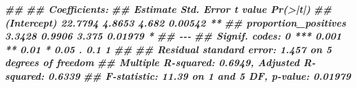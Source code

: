 \documentclass[
  11pt,
  oneside]{book}
\newenvironment{Shaded}{\begin{snugshade}}{\end{snugshade}}
\newcommand{\DocumentationTok}[1]{\textcolor[rgb]{0.56,0.35,0.01}{\textbf{\textit{#1}}}}
\begin{document}
\begin{Shaded}
\begin{Highlighting}[]
\DocumentationTok{\#\# }
\DocumentationTok{\#\# Coefficients:}
\DocumentationTok{\#\#                      Estimate Std. Error t value Pr(\textgreater{}|t|)   }
\DocumentationTok{\#\# (Intercept)           22.7794     4.8653   4.682  0.00542 **}
\DocumentationTok{\#\# proportion\_positives   3.3428     0.9906   3.375  0.01979 * }
\DocumentationTok{\#\# {-}{-}{-}}
\DocumentationTok{\#\# Signif. codes:  0 \textquotesingle{}***\textquotesingle{} 0.001 \textquotesingle{}**\textquotesingle{} 0.01 \textquotesingle{}*\textquotesingle{} 0.05 \textquotesingle{}.\textquotesingle{} 0.1 \textquotesingle{} \textquotesingle{} 1}
\DocumentationTok{\#\# }
\DocumentationTok{\#\# Residual standard error: 1.457 on 5 degrees of freedom}
\DocumentationTok{\#\# Multiple R{-}squared:  0.6949, Adjusted R{-}squared:  0.6339 }
\DocumentationTok{\#\# F{-}statistic: 11.39 on 1 and 5 DF,  p{-}value: 0.01979}


\end{Highlighting}
\end{Shaded}
\end{document}
